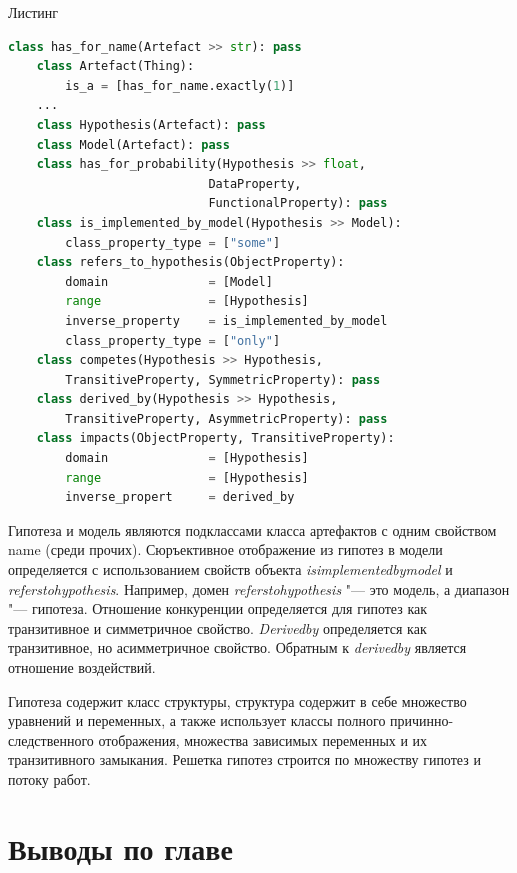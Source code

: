 \begin{ListingEnv}[!h]%
    \captiondelim{ } %
    \caption{Листинг}\label{lst:hwbeauty}
    \begin{lstlisting}[language={Python}]
    class has_for_name(Artefact >> str): pass
    class Artefact(Thing):
        is_a = [has_for_name.exactly(1)]
    ...
    class Hypothesis(Artefact): pass
    class Model(Artefact): pass
    class has_for_probability(Hypothesis >> float,
                            DataProperty,
                            FunctionalProperty): pass
    class is_implemented_by_model(Hypothesis >> Model): 
        class_property_type = ["some"]
    class refers_to_hypothesis(ObjectProperty):
        domain              = [Model]
        range               = [Hypothesis]
        inverse_property    = is_implemented_by_model
        class_property_type = ["only"]
    class competes(Hypothesis >> Hypothesis, 
        TransitiveProperty, SymmetricProperty): pass
    class derived_by(Hypothesis >> Hypothesis, 
        TransitiveProperty, AsymmetricProperty): pass
    class impacts(ObjectProperty, TransitiveProperty):
        domain              = [Hypothesis]
        range               = [Hypothesis]
        inverse_propert     = derived_by
    \end{lstlisting}
\end{ListingEnv}%

Гипотеза и модель являются подклассами класса артефактов с одним свойством name (среди прочих). Сюръективное 
отображение из гипотез в модели определяется с использованием свойств объекта 
\textit{is\textunderscore implemented\textunderscore by\textunderscore model} и 
\textit{refers\textunderscore to\textunderscore hypothesis}. Например, домен 
\textit{refers\textunderscore to\textunderscore hypothesis} "--- это модель, а диапазон "--- гипотеза. Отношение 
конкуренции определяется для гипотез как транзитивное и симметричное свойство. \textit{Derived\textunderscore by} 
определяется как транзитивное, но асимметричное свойство. Обратным к \textit{derived\textunderscore by} 
является отношение воздействий.

Гипотеза содержит класс структуры, структура содержит в себе множество уравнений и переменных, а также использует 
классы полного причинно-следственного отображения, множества зависимых переменных и их транзитивного замыкания. 
Решетка гипотез строится по множеству гипотез и потоку работ.




\section{Выводы по главе}\label{sect2_6}



\FloatBarrier
